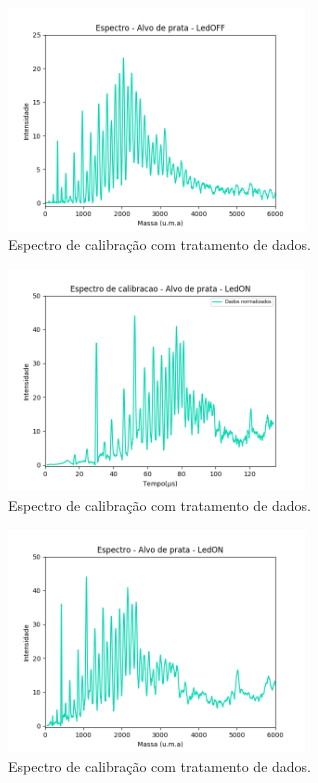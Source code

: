 \begin{figure}
  \centering  
  \includegraphics[width=0.7\textwidth]{exp_02/LEDOFF_espec_calib_ag_massa.png}
  \caption{Espectro de calibração com tratamento de dados.}
  \label{fig:02_ledoff_massa} 
\end{figure}



\begin{figure}
  \centering  
  \includegraphics[width=0.7\textwidth]{exp_02/LEDON_normalizado_mcp.png}
  \caption{Espectro de calibração com tratamento de dados.}
  \label{fig:02_ledon_dados_tratados} 
\end{figure}

\begin{figure}
  \centering  
  \includegraphics[width=0.7\textwidth]{exp_02/LEDON_espec_calib_ag_massa.png}
  \caption{Espectro de calibração com tratamento de dados.}
  \label{fig:02_ledon_massa} 
\end{figure}

